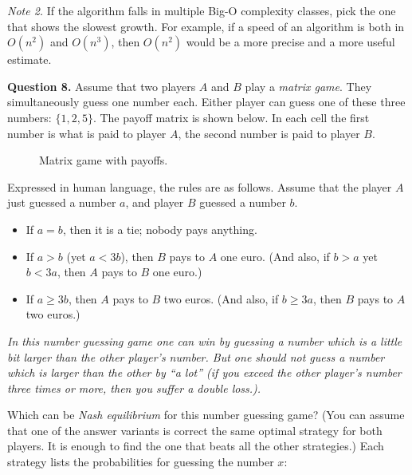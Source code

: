 \documentclass[jou]{apa6}
\begin{document}
\vspace{4pt}
{\em Note 2.} If the algorithm falls in multiple Big-O complexity classes, pick 
the one that shows the slowest growth. For example, if a speed of an algorithm is 
both in $O(n^2)$ and $O(n^3)$, 
then $O(n^2)$ would be a more precise and a more useful estimate.


\vspace{10pt}
{\bf Question 8.} Assume that two players $A$ and $B$ play a {\em matrix game}. 
They simultaneously guess one number each. Either player can guess 
one of these three numbers: $\{ 1,2,5 \}$. 
The payoff matrix is shown below. 
In each cell the first number is what is paid to player $A$, 
the second number is paid to player $B$. 

\begin{figure}[!htb]
\caption{\label{fig:matrix-game} Matrix game with payoffs.}
\end{figure}

Expressed in human language, the rules are as follows. 
Assume that the player $A$ just guessed a number $a$, and player $B$ guessed 
a number $b$. 
\begin{itemize}
\item If $a=b$, then it is a tie; nobody pays anything.
\item If $a>b$ (yet $a < 3b$), then $B$ pays to $A$ one euro. (And also, 
if $b>a$ yet $b < 3a$, then $A$ pays to $B$ one euro.)
\item If $a \geq 3b$, then $A$ pays to $B$ two euros. (And also, if $b \geq 3a$, 
then $B$ pays to $A$ two euros.)
\end{itemize}

{\em In this number guessing game one can win by guessing a number which is a little
bit larger than the other player's number. But one should not guess a number which is 
larger than the other by ``a lot'' (if you exceed the other player's number
three times or more, then you suffer a double loss.).}

Which can be {\em Nash equilibrium} for this number guessing game?
(You can assume that one of the answer variants is correct \textendash{} 
the same optimal strategy for both players. It is enough to find the 
one that beats all the other strategies.) 
Each strategy lists the probabilities for guessing the number $x$: 
\end{document}
